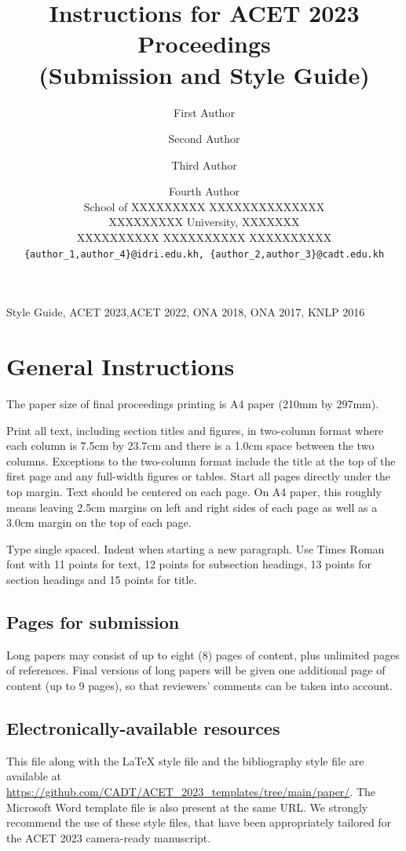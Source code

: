 \documentclass[11pt,a4paper]{article}
\title{Instructions for ACET 2023 Proceedings\\(Submission and Style Guide)}
\author{First Author\affilA \and Second Author\affilB \and Third Author\affilB \and Fourth Author\affilA\\
\affilA School of XXXXXXXXX  XXXXXXXXXXXXXX \\
XXXXXXXXX University, XXXXXXX \\
\affilB XXXXXXXXXX XXXXXXXXXX XXXXXXXXXX \\
{\tt \{author\_1,author\_4\}@idri.edu.kh,  \{author\_2,author\_3\}@cadt.edu.kh}}
\begin{document}
\maketitle

\medskip
{} Style Guide, ACET 2023,ACET 2022, ONA 2018, ONA 2017, KNLP 2016

\section{General Instructions}

The paper size of final proceedings printing is A4 paper (210mm by
297mm).

Print all text, including section titles and figures, in two-column
format where each column is 7.5cm by 23.7cm and there is a 1.0cm space
between the two columns.  Exceptions to the two-column format include
the title at the top of the first page and any full-width figures or
tables.  Start all pages directly under the top margin.  Text should be
centered on each page.  On A4 paper, this roughly means leaving 2.5cm
margins on left and right sides of each page as well as a 3.0cm margin
on the top of each page.

Type single spaced.  Indent when starting a new paragraph.  Use Times
Roman font with 11 points for text, 12 points for subsection headings,
13 points for section headings and 15 points for title.

\subsection{Pages for submission}

Long papers may consist of up to eight (8) pages of content, plus unlimited pages of references. Final versions of long papers will be given one additional page of content (up to 9 pages), so that reviewers’ comments can be taken into account.

\subsection{Electronically-available resources}

This file along with the \LaTeX{} style file and the bibliography style file are available at \url{https://github.com/CADT/ACET_2023_templates/tree/main/paper/}. The Microsoft Word template file is also present at the same URL.  We strongly recommend the use of these style files, that have been appropriately tailored for the ACET 2023 camera-ready manuscript.
\end{document}
